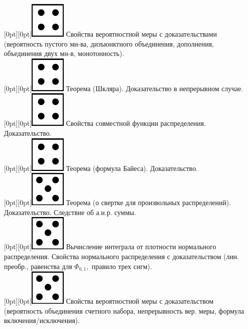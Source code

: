 \documentclass[10pt]{article}
\begin{document}
\raisebox{-1pt}[0pt][0pt]{\includegraphics[width=0.02\linewidth]{4.png}} Свойства вероятностной меры с доказательствами (вероятность пустого мн-ва, дизъюнктного объединения, дополнения, объединения двух мн-в, монотонность). \\

\raisebox{-1pt}[0pt][0pt]{\includegraphics[width=0.02\linewidth]{4.png}} Теорема (Шкляра). Доказательство в непрерывном случае. \\

\raisebox{-1pt}[0pt][0pt]{\includegraphics[width=0.02\linewidth]{4.png}} Свойства совместной функции распределения. Доказательство. \\

\raisebox{-1pt}[0pt][0pt]{\includegraphics[width=0.02\linewidth]{4.png}} Теорема (формула Байеса). Доказательство. \\

\raisebox{-1pt}[0pt][0pt]{\includegraphics[width=0.02\linewidth]{5.png}} Теорема (о свертке для произвольных распределений). Доказательство. Следствие об а.н.р. суммы. \\ 

\raisebox{-1pt}[0pt][0pt]{\includegraphics[width=0.02\linewidth]{5.png}} Вычисление интеграла от плотности нормального распределения.  Свойства нормального распределения с доказательством (лин. преобр., равенства для $\Phi_{0,1},$ правило трех сигм). \\

\raisebox{-1pt}[0pt][0pt]{\includegraphics[width=0.02\linewidth]{5.png}} Свойства  вероятностной меры с доказательством (вероятность объединения счетного набора, непрерывность вер. меры, формула включения/исключения). \\
\end{document}
